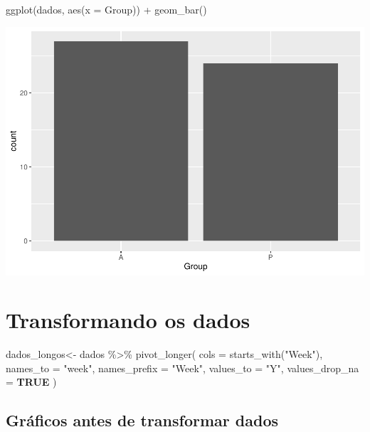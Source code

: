 \documentclass[
]{article}
\newenvironment{Shaded}{\begin{snugshade}}{\end{snugshade}}
\newcommand{\AttributeTok}[1]{\textcolor[rgb]{0.80,0.80,0.80}{#1}}
\newcommand{\ConstantTok}[1]{\textcolor[rgb]{0.86,0.64,0.64}{\textbf{#1}}}
\newcommand{\FunctionTok}[1]{\textcolor[rgb]{0.94,0.94,0.56}{#1}}
\newcommand{\NormalTok}[1]{\textcolor[rgb]{0.80,0.80,0.80}{#1}}
\newcommand{\OtherTok}[1]{\textcolor[rgb]{0.94,0.94,0.56}{#1}}
\newcommand{\SpecialCharTok}[1]{\textcolor[rgb]{0.86,0.64,0.64}{#1}}
\newcommand{\StringTok}[1]{\textcolor[rgb]{0.80,0.58,0.58}{#1}}
\begin{document}
\begin{Shaded}
\begin{Highlighting}[]
\FunctionTok{ggplot}\NormalTok{(dados, }\FunctionTok{aes}\NormalTok{(}\AttributeTok{x =}\NormalTok{ Group)) }\SpecialCharTok{+}
  \FunctionTok{geom\_bar}\NormalTok{()}
\end{Highlighting}
\end{Shaded}

\includegraphics{EDA__files/figure-latex/unnamed-chunk-3-2.pdf}

\hypertarget{transformando-os-dados}{%
\section{Transformando os dados}\label{transformando-os-dados}}

\begin{Shaded}
\begin{Highlighting}[]
\NormalTok{dados\_longos}\OtherTok{\textless{}{-}}\NormalTok{ dados }\SpecialCharTok{\%\textgreater{}\%}
  \FunctionTok{pivot\_longer}\NormalTok{(}
    \AttributeTok{cols =} \FunctionTok{starts\_with}\NormalTok{(}\StringTok{"Week"}\NormalTok{),}
    \AttributeTok{names\_to =} \StringTok{"week"}\NormalTok{,}
    \AttributeTok{names\_prefix =} \StringTok{"Week"}\NormalTok{,}
    \AttributeTok{values\_to =} \StringTok{"Y"}\NormalTok{,}
    \AttributeTok{values\_drop\_na =} \ConstantTok{TRUE}
\NormalTok{  )}
\end{Highlighting}
\end{Shaded}

\hypertarget{gruxe1ficos-antes-de-transformar-dados}{%
\subsection{Gráficos antes de transformar
dados}\label{gruxe1ficos-antes-de-transformar-dados}}
\end{document}
